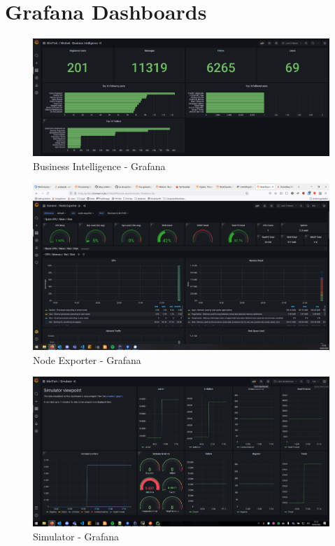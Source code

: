 \section{Grafana Dashboards}\label{app:grafana_dashboards}

\begin{figure}[H]
    \centering
    \includegraphics[width = \linewidth]{images/monitoring/business_intelligence_1.png}
    \caption{Business Intelligence - Grafana}
\end{figure}

\begin{figure}[H]
    \centering
    \includegraphics[width = \linewidth]{images/monitoring/node_exporter_1.png}
    \caption{Node Exporter - Grafana}
\end{figure}

\begin{figure}[H]
    \centering
    \includegraphics[width = \linewidth]{images/monitoring/simulator_1.png}
    \caption{Simulator - Grafana}
\end{figure}

